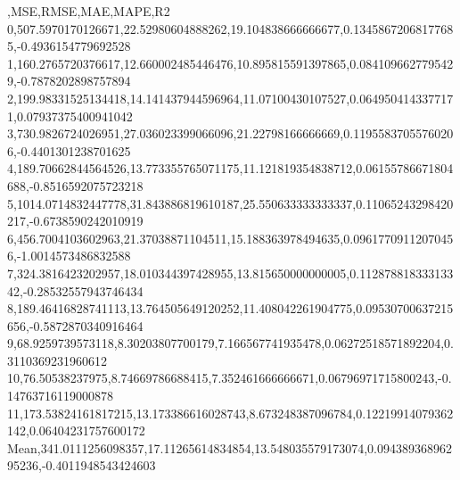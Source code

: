 ,MSE,RMSE,MAE,MAPE,R2
0,507.5970170126671,22.52980604888262,19.104838666666677,0.13458672068177685,-0.4936154779692528
1,160.2765720376617,12.660002485446476,10.895815591397865,0.0841096627795429,-0.7878202898757894
2,199.98331525134418,14.141437944596964,11.07100430107527,0.0649504143377171,0.07937375400941042
3,730.9826724026951,27.036023399066096,21.22798166666669,0.11955837055760206,-0.4401301238701625
4,189.70662844564526,13.773355765071175,11.121819354838712,0.06155786671804688,-0.8516592075723218
5,1014.0714832447778,31.843886819610187,25.550633333333337,0.11065243298420217,-0.6738590242010919
6,456.7004103602963,21.37038871104511,15.188363978494635,0.09617709112070456,-1.0014573486832588
7,324.3816423202957,18.010344397428955,13.815650000000005,0.11287881833313342,-0.28532557943746434
8,189.46416828741113,13.764505649120252,11.408042261904775,0.09530700637215656,-0.5872870340916464
9,68.9259739573118,8.30203807700179,7.166567741935478,0.06272518571892204,0.3110369231960612
10,76.50538237975,8.74669786688415,7.352461666666671,0.06796971715800243,-0.14763716119000878
11,173.53824161817215,13.173386616028743,8.673248387096784,0.12219914079362142,0.06404231757600172
Mean,341.0111256098357,17.11265614834854,13.548035579173074,0.09438936896295236,-0.4011948543424603
